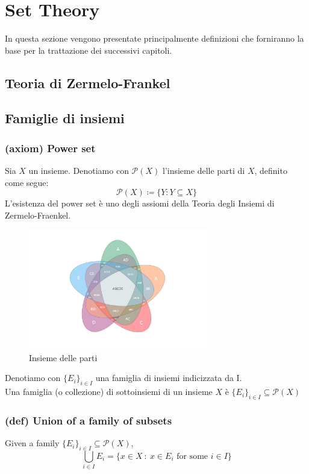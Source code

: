 \section{Set Theory}

In questa sezione vengono presentate principalmente definizioni che forniranno la base per la trattazione dei successivi capitoli.
\subsection{Teoria di Zermelo-Frankel}
\subsection{Famiglie di insiemi}
\subsubsection{(axiom) Power set}
Sia $X$ un insieme. Denotiamo con $\mathcal P(X)$ l'insieme delle parti di $X$, definito come segue:
$$\mathcal P(X)\coloneqq \{ Y : Y\subseteq X\}$$
L'esistenza del power set è uno degli assiomi della Teoria degli Insiemi di Zermelo-Fraenkel.
\begin{figure}[H] %
    \centering
    \includegraphics[width=0.7\textwidth]{assets/sets-5b180229ff1b780036cfb499.jpg}
    \caption{Insieme delle parti}
    \label{fig:example_image}
\end{figure}
Denotiamo con $\{E_i\}_{i\in I}$ una famiglia di insiemi indicizzata da I.\\

Una famiglia (o collezione) di sottoinsiemi di un insieme $X$ è $\{E_i\}_{i\in I}\subseteq \mathcal P(X)$
\subsubsection{(def) Union of a family of subsets}
Given a family $\{E_i\}_{i\in I}\subseteq \mathcal P(X)$,
$$\bigcup_{i\in I} E_i = \{x\in X\ : \ x\in E_i \text{ for some } i\in I\}$$
